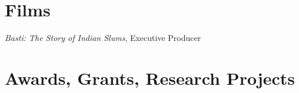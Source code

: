 \documentclass[11pt,letterpaper]{report}
\newcommand{\listitemspace}{0.25em}
\renewenvironment{itemize}
{\begin{list}{}{\setlength{\leftmargin}{0em}
                \setlength{\parskip}{0em}
                \setlength{\itemsep}{\listitemspace}
                \setlength{\parsep}{\listitemspace}}}
{\end{list}}
\begin{document}







    \section*{Films}

    \begin{itemize}

        \item \textit{Basti: The Story of Indian Slums}, Executive Producer

    \end{itemize}    

    \section*{Awards, Grants, Research Projects}
\end{document}

